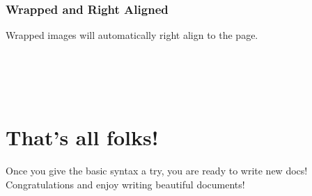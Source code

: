 \subsubsection{Wrapped and Right Aligned}
Wrapped images will automatically right align to the page.\\\\
\\
\\\\

\section{That's all folks!}
Once you give the basic syntax a try, you are ready to write new docs!\\Congratulations and enjoy writing beautiful documents!

